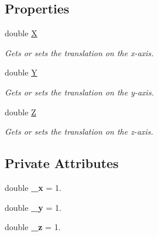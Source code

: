 \subsection*{Properties}
\begin{DoxyCompactItemize}
\item 
double \hyperlink{class_lib_noise_1_1_operator_1_1_translate_a1dddf8dbc64e31ab50ef9d0f3fba67ed}{X}
\begin{DoxyCompactList}\small\item\em Gets or sets the translation on the x-\/axis. \end{DoxyCompactList}\item 
double \hyperlink{class_lib_noise_1_1_operator_1_1_translate_a9c9152d3694904bc41131c74808a5c71}{Y}
\begin{DoxyCompactList}\small\item\em Gets or sets the translation on the y-\/axis. \end{DoxyCompactList}\item 
double \hyperlink{class_lib_noise_1_1_operator_1_1_translate_a30fa2c1df3b8b33ad460c877aabfc9c8}{Z}
\begin{DoxyCompactList}\small\item\em Gets or sets the translation on the z-\/axis. \end{DoxyCompactList}\end{DoxyCompactItemize}
\subsection*{Private Attributes}
\begin{DoxyCompactItemize}
\item 
\mbox{\label{class_lib_noise_1_1_operator_1_1_translate_a21ecf5387d5ee01ab55fea08288ca45e}} 
double {\bfseries \+\_\+x} = 1.
\item 
\mbox{\label{class_lib_noise_1_1_operator_1_1_translate_a52c887f1c6357f6f067e10d18149e8aa}} 
double {\bfseries \+\_\+y} = 1.
\item 
\mbox{\label{class_lib_noise_1_1_operator_1_1_translate_a22b0dce866e6671be9199d769af8c1de}} 
double {\bfseries \+\_\+z} = 1.
\end{DoxyCompactItemize}
